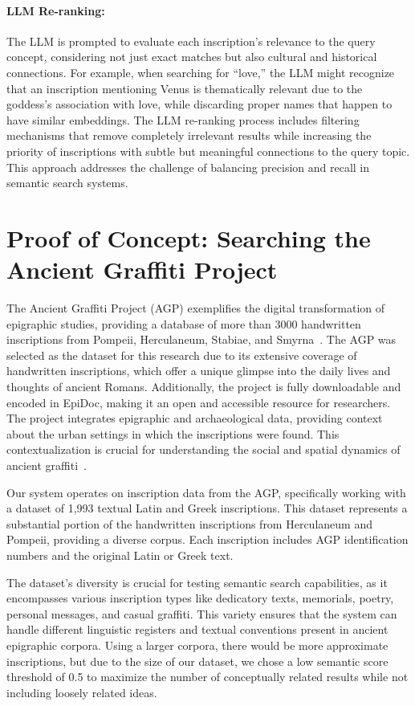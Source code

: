 \documentclass[final,greek,american]{anthology-ch}
\begin{document}
\paragraph{LLM Re-ranking:} The LLM is prompted to evaluate each inscription's relevance to the query concept, considering not just exact matches but also cultural and historical connections. For example, when searching for ``love,'' the LLM might recognize that an inscription mentioning Venus is thematically relevant due to the goddess's association with love, while discarding proper names that happen to have similar embeddings. The LLM re-ranking process includes filtering mechanisms that remove completely irrelevant results while increasing the priority of inscriptions with subtle but meaningful connections to the query topic. This approach addresses the challenge of balancing precision and recall in semantic search systems.

\section{Proof of Concept: Searching the Ancient Graffiti Project}
The Ancient Graffiti Project (AGP) exemplifies the digital transformation of epigraphic studies, providing a database of more than 3000 handwritten inscriptions from Pompeii, Herculaneum, Stabiae, and Smyrna~\cite{benefiel_ancient_2017}. The AGP was selected as the dataset for this research due to its extensive coverage of handwritten inscriptions, which offer a unique glimpse into the daily lives and thoughts of ancient Romans. Additionally, the project is fully downloadable and encoded in EpiDoc, making it an open and accessible resource for researchers. The project integrates epigraphic and archaeological data, providing context about the urban settings in which the inscriptions were found. This contextualization is crucial for understanding the social and spatial dynamics of ancient graffiti~\cite{benefiel_documenting_2023}.

Our system operates on inscription data from the AGP, specifically working with a dataset of 1,993 textual Latin and Greek inscriptions. This dataset represents a substantial portion of the handwritten inscriptions from Herculaneum and Pompeii, providing a diverse corpus. Each inscription includes AGP identification numbers and the original Latin or Greek text.

The dataset's diversity is crucial for testing semantic search capabilities, as it encompasses various inscription types like dedicatory texts, memorials, poetry, personal messages, and casual graffiti. This variety ensures that the system can handle different linguistic registers and textual conventions present in ancient epigraphic corpora. Using a larger corpora, there would be more approximate inscriptions, but due to the size of our dataset, we chose a low semantic score threshold of 0.5 to maximize the number of conceptually related results while not including loosely related ideas.
\end{document}
